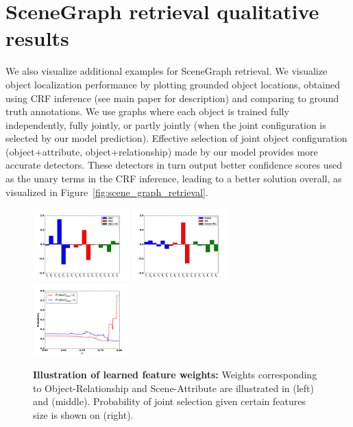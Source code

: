 \documentclass[runningheads]{llncs}
\newcommand{\RevComment} [1]{{\color{Red}{#1}}}
\begin{document}
\section{SceneGraph retrieval qualitative results}
We also visualize additional examples for SceneGraph retrieval. We visualize object localization performance by plotting grounded object locations, obtained using CRF inference (see main paper for description) and comparing to ground truth annotations. We use graphs where each object is trained fully independently, fully jointly, or partly jointly (when the joint configuration is selected by our model prediction). Effective selection of joint object configuration (object+attribute, object+relationship) made by our model provides more accurate detectors. These detectors in turn output better confidence scores used as the unary terms in the CRF inference, leading to a better solution overall, as visualized in Figure~\ref{fig:scene_graph_retrieval}. 


\begin{figure}[t]
    \centering
    \includegraphics[width=3.7cm]{obj_rel_o1r_o2_coeffs.png}\hspace{0em}
    \includegraphics[width=3.7cm]{att_scene_coeffs.png}\hspace{0em}
    \includegraphics[width=3.7cm]{att_scene_prob_joint_given_med_mean.png}
    \caption{{\bf Illustration of learned feature weights:} Weights corresponding to Object-Relationship and Scene-Attribute are illustrated in (left) and (middle). Probability of joint selection given certain features size is shown on (right).}%
    \label{fig:learned_weights}
\end{figure}
\end{document}

